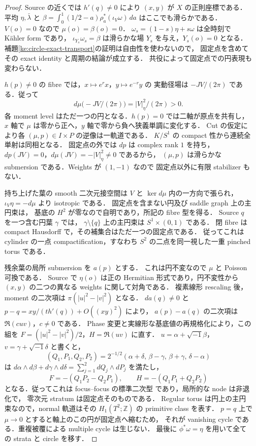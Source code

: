 \begin{proof}
Source の近くでは $h'(q)\ne0$ により $(x,y)$ が $X$ の正則座標である．
平均 $\eta,\bar\lambda$ と
$\beta=\int_0^1(1/2-a)\rho_a^*(\iota_V\omega)\,da$ はここでも滑らかである．
$V(o)=0$ なので $\mu(o)=\beta(o)=0$．
$\omega_s=(1-s)\eta+s\omega$ は全時刻で K\"ahler form であり，
$\iota_{Y_s}\omega_s=\beta$ は滑らかな場 $Y_s$ を与え，$Y_s(o)=0$ となる．
補題\ref{ke:circle-exact-transport}の証明は自由性を使わないので，
固定点を含めてその exact identity と周期の結論が成立する．
共役によって固定点での円表現も変わらない．

$h(p)\ne0$ の fibre では，$x\mapsto e^r x$，$y\mapsto e^{-r}y$ の
実動径場は $-JV/(2\pi)$ である．従って
\[
 d\mu\bigl(-JV/(2\pi)\bigr)=|V|_\eta^2/(2\pi)>0.
\]
各 moment level はただ一つの円となる．$h(p)=0$ では二軸が原点を共有し，
$x$ 軸で $\mu$ は零から正へ，$y$ 軸で零から負へ狭義単調に変化する．
Cut の仮定により各 $(\mu,p)\in I\times P$ の逆像は一軌道である．
$K/S^1$ の compact 性から連続全単射は同相となる．
固定点の外では $dp$ は complex rank $1$ を持ち，
$dp(JV)=0$，$d\mu(JV)=-|V|_\eta^2\ne0$ であるから，
$(\mu,p)$ は滑らかな submersion である．Weights が $(1,-1)$ なので
固定点以外に有限 stabilizer もない．

持ち上げた葉の smooth 二次元接空間は $V$ と
$\ker d\mu$ 内の一方向で張られ，$\iota_V\eta=-d\mu$ より isotropic である．
固定点を含まない円及び saddle graph 上の主円束は，
基底の $H^2$ が零なので自明であり，所記の fibre 型を得る．
Source $q$ を一つ含む円葉 $\gamma$ では，
$\gamma\setminus\{q\}$ 上の主円束は $S^1\times(0,1)$ である．
閉 fibre は compact Hausdorff で，その補集合はただ一つの固定点である．
従ってこれは cylinder の一点 compactification，すなわち
$S^2$ の二点を同一視した一重 pinched torus である．

残余葉の局所 submersion を $a(p)$ とする．
これは円不変なので $\mu$ と Poisson 可換である．
Source で $\eta(o)$ は正の Hermitian 形式であり，円不変性から
$(x,y)$ の二つの異なる weights に関して対角である．
複素線形 rescaling 後，moment の二次項は
$\pi(|u|^2-|v|^2)$ となる．
$da(q)\ne0$ と $p-q=xy/(t h'(q))+O((xy)^2)$ により，
$a(p)-a(q)$ の二次項は $\Re(cuv)$，$c\ne0$ である．
Phase 変更と実線形な基底値の再規格化により，この組を
$F=(|u|^2-|v|^2)/2$，$H=\Re(uv)$ に直す．
$u=\alpha+\sqrt{-1}\beta$，$v=\gamma+\sqrt{-1}\delta$ と書くと，
\[
 (Q_1,P_1,Q_2,P_2)
 =2^{-1/2}(\alpha+\delta,\,\beta-\gamma,\,\beta+\gamma,\,\delta-\alpha)
\]
は $d\alpha\wedge d\beta+d\gamma\wedge d\delta=\sum_{j=1}^2dQ_j\wedge dP_j$ を満たし，
\[
 F=-(Q_1P_2-Q_2P_1),\qquad H=-(Q_1P_1+Q_2P_2)
\]
となる．従ってこれは focus--focus の標準二次型
\cite[Section~2]{ZungFocus}であり，局所的な node は非退化で，
零次元 stratum は固定点そのものである．
Regular torus は円上の主円束なので，normal 軌道はその
$H_1(T^2;\mathbb Z)$ の primitive class を表す．
$p=q$ 上で $\mu\to0$ とすると軸上のこの円が固定点へ縮むため，
それが vanishing cycle である．重複被覆による multiple cycle は生じない．
最後に $\phi^*\omega=\eta$ を用いて全ての strata と circle を移す．
\end{proof}

